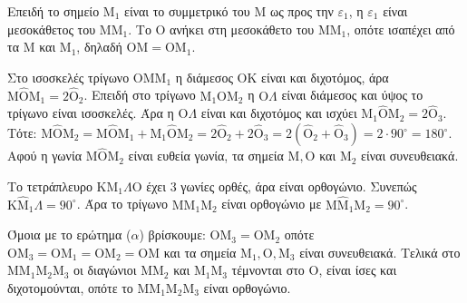 \begin{alist}
    \item
    \begin{rlist}
        \item Επειδή το σημείο $\mathrm{M}_1$ είναι το συμμετρικό του $\mathrm{M}$ ως προς την $\varepsilon_1$, η $\varepsilon_1$ είναι μεσοκάθετος του $\mathrm{M}\mathrm{M}_1$. Το $\mathrm{O}$ ανήκει στη μεσοκάθετο του $\mathrm{M}\mathrm{M}_1$, οπότε ισαπέχει από τα $\mathrm{M}$ και $\mathrm{M}_1$, δηλαδή $\mathrm{O}\mathrm{M} = \mathrm{O}\mathrm{M}_1$.
        
        
        \item Στο ισοσκελές τρίγωνο $\mathrm{O}\mathrm{M}\mathrm{M}_1$ η διάμεσος $\mathrm{O}\mathrm{K}$ είναι και διχοτόμος, άρα $\mathrm{M}\hat{\mathrm{O}}\mathrm{M}_1 = 2 \hat{\mathrm{O}}_2$.
        Επειδή στο τρίγωνο $\mathrm{M}_1\mathrm{O}\mathrm{M}_2$ η $\mathrm{O}\Lambda$ είναι διάμεσος και ύψος το τρίγωνο είναι ισοσκελές. Άρα η $\mathrm{O}\Lambda$ είναι και διχοτόμος και ισχύει $\mathrm{M}_1\hat{\mathrm{O}}\mathrm{M}_2 = 2\hat{\mathrm{O}}_3$.
        Τότε: $\mathrm{M}\hat{\mathrm{O}}\mathrm{M}_2 = \mathrm{M}\hat{\mathrm{O}}\mathrm{M}_1 + \mathrm{M}_1\hat{\mathrm{O}}\mathrm{M}_2 = 2\hat{\mathrm{O}}_2 + 2\hat{\mathrm{O}}_3 = 2(\hat{\mathrm{O}}_2 + \hat{\mathrm{O}}_3) = 2 \cdot 90^\circ = 180^\circ$.
        Αφού η γωνία $\mathrm{M}\hat{\mathrm{O}}\mathrm{M}_2$ είναι ευθεία γωνία, τα σημεία $\mathrm{M}, \mathrm{O}$ και $\mathrm{M}_2$ είναι συνευθειακά.
        
        \item Το τετράπλευρο $\mathrm{K}\mathrm{M}_1\Lambda\mathrm{O}$ έχει $3$ γωνίες ορθές, άρα είναι ορθογώνιο. Συνεπώς $\mathrm{K}\hat{\mathrm{M}}_1\Lambda = 90^\circ$. Άρα το τρίγωνο $\mathrm{M}\mathrm{M}_1\mathrm{M}_2$ είναι ορθογώνιο με $\mathrm{M}\hat{\mathrm{M}}_1\mathrm{M}_2 = 90^\circ$.
    \end{rlist}
    
    \item Όμοια με το ερώτημα ($\alpha$) βρίσκουμε:
    $\mathrm{O}\mathrm{M}_3 = \mathrm{O}\mathrm{M}_2$ οπότε $\mathrm{O}\mathrm{M}_3 = \mathrm{O}\mathrm{M}_1 = \mathrm{O}\mathrm{M}_2 = \mathrm{O}\mathrm{M}$ και τα σημεία $\mathrm{M}_1, \mathrm{O}, \mathrm{M}_3$ είναι συνευθειακά.
    Τελικά στο $\mathrm{M}\mathrm{M}_1\mathrm{M}_2\mathrm{M}_3$ οι διαγώνιοι $\mathrm{M}\mathrm{M}_2$ και $\mathrm{M}_1\mathrm{M}_3$ τέμνονται στο $\mathrm{O}$, είναι ίσες και διχοτομούνται, οπότε το $\mathrm{M}\mathrm{M}_1\mathrm{M}_2\mathrm{M}_3$ είναι ορθογώνιο.
\end{alist}
